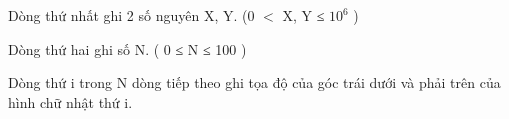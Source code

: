 Dòng thứ nhất ghi 2 số nguyên X, Y. (0 $<$ X, Y ≤ $10^{6}$   )  

   Dòng thứ hai ghi số N. ( 0 ≤ N ≤ 100 )  

   Dòng thứ i trong N dòng tiếp theo ghi tọa độ của góc trái dưới và phải trên của hình chữ nhật thứ i.